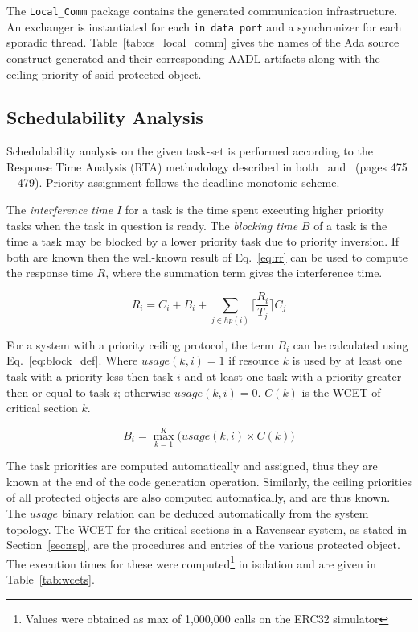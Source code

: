 The \texttt{Local\_Comm} package contains the generated communication
infrastructure. An exchanger is instantiated for each \texttt{in data
  port} and a synchronizer for each sporadic
thread. Table~\ref{tab:cs_local_comm} gives the names of the Ada source
construct generated and their corresponding AADL artifacts along with
the ceiling priority of said protected object.

\subsection{Schedulability Analysis}
Schedulability analysis on the given task-set is performed according
to the Response Time Analysis (RTA) methodology described in
both~\cite{burns@adalett04} and~\cite{burns-rtspl} (pages
475---479). Priority assignment follows the deadline monotonic scheme.

The \emph{interference time} $I$ for a task is the time spent
executing higher priority tasks when the task in question is
ready. The \emph{blocking time} $B$ of a task is the time a task may
be blocked by a lower priority task due to priority inversion. If both
are known then the well-known result of Eq.~\ref{eq:rr} can
be used to compute the response time $R$, where the summation term
gives the interference time.

\begin{equation}
\label{eq:rr}
R_i=C_i + B_i + \sum_{j\in hp(i)}\Bigg\lceil \frac{R_i}{T_j}\Bigg\rceil C_j
\end{equation}

For a system with a priority ceiling protocol, the term $B_i$ can be
calculated using Eq.~\ref{eq:block_def}. Where $usage(k,i)=1$ if
resource $k$ is used by at least one task with a priority less then
task $i$ and at least one task with a priority greater then or equal
to task $i$; otherwise $usage(k,i)=0$. $C(k)$ is the WCET of critical
section $k$.

\begin{equation}
\label{eq:block_def}
B_i = \max_{k=1}^{K} \Big(usage(k,i)\times C(k)\Big)
\end{equation}

The task priorities are computed automatically and assigned, thus they
are known at the end of the code generation operation. Similarly, the
ceiling priorities of all protected objects are also computed
automatically, and are thus known. The $usage$ binary relation can be
deduced automatically from the system topology. The WCET for the
critical sections in a Ravenscar system, as stated in
Section~\ref{sec:rsp}, are the procedures and entries of the various
protected object. The execution times for these were
computed\footnote{Values were obtained as max of 1,000,000 calls on
  the ERC32 simulator} in isolation and are given in
Table~\ref{tab:wcets}.

